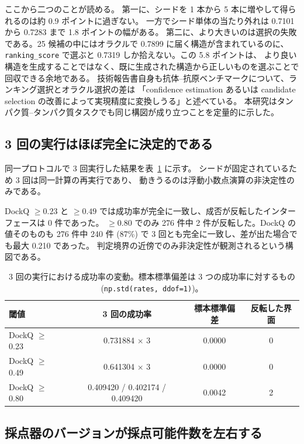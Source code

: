 \documentclass[11pt,a4paper]{article}
\begin{document}
ここから二つのことが読める。
第一に、シードを 1 本から 5 本に増やして得られるのは約 0.9 ポイントに過ぎない。
一方でシード単体の当たり外れは 0.7101 から 0.7283 まで 1.8 ポイントの幅がある。
第二に、より大きいのは選択の失敗である。25 候補の中にはオラクルで 0.7899 に届く構造が含まれているのに、
\texttt{ranking\_score} で選ぶと 0.7319 しか拾えない。この 5.8 ポイントは、
より良い構造を生成することではなく、既に生成された構造から正しいものを選ぶことで回収できる余地である。
技術報告書自身も抗体--抗原ベンチマークについて、ランキング選択とオラクル選択の差は
「confidence estimation あるいは candidate selection の改善によって実現精度に変換しうる」と述べている。
本研究はタンパク質--タンパク質タスクでも同じ構図が成り立つことを定量的に示した。

\subsection{3 回の実行はほぼ完全に決定的である}

同一プロトコルで 3 回実行した結果を表~\ref{tab:variance} に示す。
シードが固定されているため 3 回は同一計算の再実行であり、
動きうるのは浮動小数点演算の非決定性のみである。

DockQ $\geq 0.23$ と $\geq 0.49$ では成功率が完全に一致し、成否が反転したインターフェースは 0 件であった。
$\geq 0.80$ でのみ 276 件中 2 件が反転した。DockQ の値そのものも 276 件中 240 件 (87\%) で
3 回とも完全に一致し、差が出た場合でも最大 0.210 であった。
判定境界の近傍でのみ非決定性が観測されるという構図である。

\begin{table}[htbp]
\centering
\caption{3 回の実行における成功率の変動。標本標準偏差は 3 つの成功率に対するもの
(\texttt{np.std(rates, ddof=1)})。}
\label{tab:variance}
\begin{tabular}{lccc}
\toprule
閾値 & 3 回の成功率 & 標本標準偏差 & 反転した界面 \\
\midrule
DockQ $\geq$ 0.23 & 0.731884 $\times$ 3 & 0.0000 & 0 \\
DockQ $\geq$ 0.49 & 0.641304 $\times$ 3 & 0.0000 & 0 \\
DockQ $\geq$ 0.80 & 0.409420 / 0.402174 / 0.409420 & 0.0042 & 2 \\
\bottomrule
\end{tabular}
\end{table}

\subsection{採点器のバージョンが採点可能件数を左右する}
\end{document}
